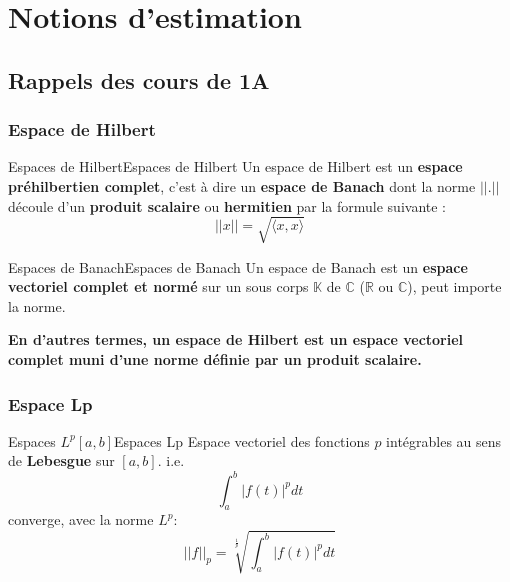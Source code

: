 \chapter{Notions d'estimation}
\section{Rappels des cours de 1A}
\subsection{Espace de Hilbert}
\begin{definition}{Espaces de Hilbert}{Espaces de Hilbert}
    Un espace de Hilbert est un \textbf{espace préhilbertien complet}, c'est à dire un \textbf{espace de Banach} dont la norme $||.||$ découle d'un \textbf{produit scalaire} ou \textbf{hermitien} par la formule suivante :
    \begin{equation}
        ||x|| = \sqrt{\langle x,x \rangle}
    \end{equation}
\end{definition}
\begin{definition}{Espaces de Banach}{Espaces de Banach}
    Un espace de Banach est un \textbf{espace vectoriel complet et normé} sur un sous corps $\mathbb{K}$ de $\mathbb{C}$ ($\mathbb{R}$ ou $\mathbb{C}$), peut importe la norme.
\end{definition}
\noindent \textbf{En d'autres termes, un espace de Hilbert est un espace vectoriel complet muni d'une norme définie par un produit scalaire.}
\subsection{Espace Lp}
\begin{definition}{Espaces $L^{p}[a,b]$}{Espaces Lp}
    Espace vectoriel des fonctions $p$ intégrables au sens de \textbf{Lebesgue} sur $[a,b]$. i.e.
    \begin{equation}
        \int_{a}^{b}{|f(t)|^{p}dt} 
    \end{equation}
    converge, avec la norme $L^{p}$: 
    \begin{equation}
        ||f||_{p} = \sqrt[\frac{1}{p}]{\int_{a}^{b}{|f(t)|^{p}dt}}
    \end{equation}
\end{definition}
\newpage
